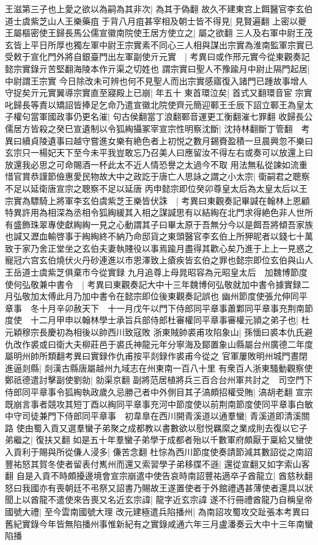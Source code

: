 王滋第三子也上愛之欲以為嗣為其非次|{
	為其于偽翻}
故久不建東宫上餌醫官李玄伯道士虞紫芝山人王樂藥疽于背八月疽甚宰相及朝士皆不得見|{
	見賢遍翻}
上密以夔王屬樞密使王歸長馬公儒宣徽南院使王居方使立之|{
	屬之欲翻}
三人及右軍中尉王茂玄皆上平日所厚也獨左軍中尉王宗實素不同心三人相與謀出宗實為淮南監軍宗實已受敕于宣化門外將自銀臺門出左軍副使亓元實　|{
	考異曰或作邢元實今從東觀奏記懿宗實錄亓苦堅翻海陵本作亓渠之切姓也}
謂宗實曰聖人不豫踰月中尉止隔門起居|{
	中尉謂王宗實}
今日除改未可辨也何不見聖人而出宗實感寤復入諸門已踵故事增人守捉矣亓元實翼導宗實直至寢殿上已崩|{
	年五十}
東首環泣矣|{
	首式又翻環音宦}
宗實叱歸長等責以矯詔皆捧足乞命乃遣宣徽北院使齊元簡迎鄆王壬辰下詔立鄆王為皇太子權句當軍國政事仍更名漼|{
	句古侯翻當丁浪翻鄆音運更工衡翻漼七罪翻}
收歸長公儒居方皆殺之癸巳宣遺制以令狐綯攝冢宰宣宗性明察沈斷|{
	沈持林翻斷丁管翻　考異曰續貞陵遺事曰越守嘗進女樂有絶色者上初悦之數月錫賚盈積一旦晨興忽不樂曰玄宗只一楊妃天下至今未平我豈敢忘乃召美人曰應留汝不得左右或奏可以放還上曰放還我必思之可命賜酒一杯此太不近人情恐譽之太過今不取}
用法無私從諫如流重惜官賞恭謹節儉惠愛民物故大中之政訖于唐亡人思詠之謂之小太宗|{
	衛嗣君之聰察不足以延衛唐宣宗之聰察不足以延唐}
丙申懿宗即位癸卯尊皇太后為太皇太后以王宗實為驃騎上將軍李玄伯虞紫芝王樂皆伏誅　|{
	考異曰東觀奏記畢諴在翰林上恩顧特異許用為相深為丞相令狐綯緩其入相之謀諴思有以結綯在北門求得絶色非人世所有盛飾珠翠專使獻綯綯一見之心動謂其子曰畢太原于吾無分今以是餌吾將傾吾家族也諴又瀝血輸啓事于綯綯終不納乃命邸貨之東頭醫官李玄伯上所狎昵者以錢七十萬致于家乃舍正堂坐之玄伯夫妻執賤役以事焉踰月盡得其歡心矣乃進于上上一見惑之寵冠六宫玄伯燒伏火丹砂連進以市恩澤致上瘡疾皆玄伯之罪也懿宗即位玄伯與山人王岳道士虞紫芝俱棄市今從實録}
九月追尊上母晁昭容為元昭皇太后　加魏博節度使何弘敬兼中書令　|{
	考異曰東觀奏記大中十三年魏博何弘敬就加中書令據實録二月弘敬加太傅此月乃加中書令在懿宗即位後東觀奏記誤也}
幽州節度使張允伸同平章事　冬十月辛卯赦天下　十一月戊午以門下侍郎同平章事蕭鄴同平章事充荆南節度使　十二月甲申以翰林學士承旨兵部侍郎杜審權同平章事審權元頴之弟子也|{
	杜元穎穆宗長慶初為相後以帥西川致寇敗}
浙東賊帥裘甫攻陷象山|{
	孫愐曰裘本仇氏避仇改作裘或曰衛大夫柳莊邑于裘氏神龍元年分寧海及鄮置象山縣屬台州廣德二年度屬明州帥所類翻考異曰實録作仇甫按平剡録作裘甫今從之}
官軍屢敗明州城門晝閉進逼剡縣|{
	剡漢古縣唐屬越州九域志在州東南一百八十里}
有衆百人浙東騷動觀察使鄭祇德遣討擊副使劉勍|{
	勍渠京翻}
副將范居植將兵三百合台州軍共討之　司空門下侍郎同平章事令狐綯執政歲久忌勝己者中外側目其子滈頗招權受賄|{
	滈胡老翻}
宣宗既崩言事者競攻其短丁酉以綯同平章事充河中節度使以前荆南節度使同平章事白敏中守司徒兼門下侍郎同平章事　初韋臯在西川開青溪道以通羣蠻|{
	青溪道即清溪關路}
使由蜀入貢又選羣蠻子弟聚之成都教以書數欲以慰悦羈縻之業成則去復以它子弟繼之|{
	復扶又翻}
如是五十年羣蠻子弟學于成都者殆以千數軍府頗厭于稟給又蠻使入貢利于賜與所從傔人浸多|{
	傔苦念翻}
杜悰為西川節度使奏請節減其數詔從之南詔豐祐怒其賀冬使者留表付嶲州而還又索習學子弟移牒不遜|{
	還從宣翻又如字索山客翻}
自是入貢不時頗擾邊境會宣宗崩遣中使告哀時南詔豐祐適卒子酋龍立|{
	酋慈秋翻}
怒曰我國亦有喪朝廷不弔祭又詔書乃賜故王遂置使者于外館禮遇甚薄使者還具以狀聞上以酋龍不遣使來告喪又名近玄宗諱|{
	龍字近玄宗諱}
遂不行冊禮酋龍乃自稱皇帝國號大禮|{
	至今雲南國號大理}
改元建極遣兵陷播州|{
	為南詔攻蜀攻交趾張本考異曰舊紀實錄今年皆無陷播州事惟新紀有之實錄咸通六年三月盧潘奏云大中十三年南蠻陷播}


